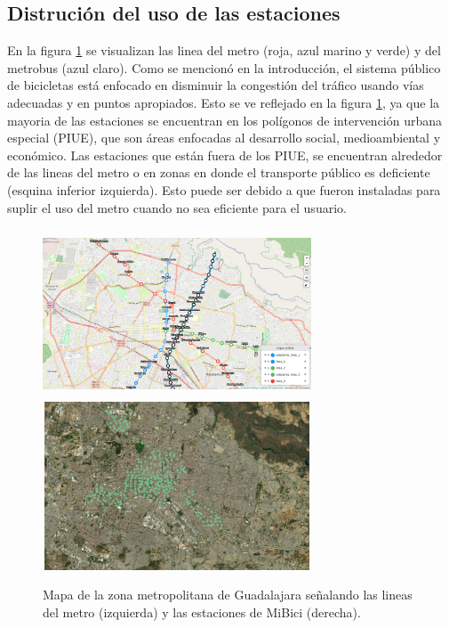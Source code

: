 \subsection{Distrución del uso de las estaciones}

En la figura \ref{fig:map_metro_stations} se visualizan las linea del metro (roja, azul marino y verde) y del metrobus (azul claro). Como se mencionó en la introducción, el sistema público de bicicletas está enfocado en disminuir la congestión del tráfico usando vías adecuadas y en puntos apropiados. Esto se ve reflejado en la figura \ref{fig:map_metro_stations}, ya que la mayoria de las estaciones se encuentran en los polígonos de intervención urbana especial (PIUE), que son áreas enfocadas al desarrollo social, medioambiental y económico\cite{poligono_2018}. Las estaciones que están fuera de los PIUE, se encuentran alrededor de las lineas del metro o en zonas en donde el transporte público es deficiente (esquina inferior izquierda). Esto puede ser debido a que fueron instaladas para suplir el uso del metro cuando no sea eficiente para el usuario.

\begin{figure}[H]
    \centering
    \includegraphics[width=8cm,height=5cm]{Graphics/map_with_metro_lines.png}
    \includegraphics[width=8cm,height=5cm]{Graphics/stations.png}
    \caption{Mapa de la zona metropolitana de Guadalajara señalando las lineas del metro (izquierda) y las estaciones de MiBici (derecha).}
    \label{fig:map_metro_stations}
\end{figure}

